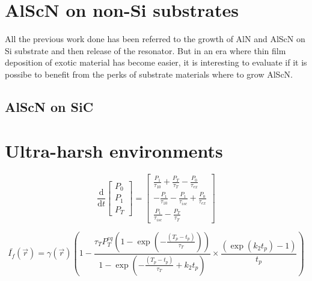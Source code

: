 \section{AlScN on non-Si substrates}
All the previous work done has been referred to the growth of AlN and AlScN on Si substrate and then release of the resonator. But in an era where thin film deposition of exotic material has become easier, it is interesting to evaluate if it is possibe to benefit from the perks of substrate materials where to grow AlScN.

\subsection{AlScN on SiC}


\section{Ultra-harsh environments}


\begin{equation}\label{eqn:rate_eqns}
\frac{\textrm{d}}{\textrm{d}t}\left[
\begin{array}{l}
P_{\textit{0}} \\
P_{\textit{1}} \\
P_{\textit{T}}
\end{array}
\right] =
\left[
\begin{array}{l}
\frac{P_{\textit{1}}}{\tau_{\textit{10}}} + \frac{P_{\textit{T}}}{\tau_{\textit{T}}} - \frac{P_{\textit{0}}}{\tau_{\textit{ex}}} \\
- \frac{P_{\textit{1}}}{\tau_{\textit{10}}} - \frac{P_{\textit{1}}}{\tau_{isc}} + \frac{P_{\textit{0}}}{\tau_{\textit{ex}}} \\
\frac{P_{\textit{1}}}{\tau_{isc}} -  \frac{P_{\textit{T}}}{\tau_{\textit{T}}}
\end{array}
\right]
\end{equation}


\begin{equation}\label{eqn:avgfluorescence}
\bar{I_{f}}(\vec{r})
	= \gamma(\vec{r}) \left(1 - \frac{\tau_{\textit{T}} P_{\textit{T}}^{{eq}}\left(1-\exp \left(-\frac{(T_p - t_p)}{\tau_{\textit{T}}}\right)\right)}{1-\exp\left(-\frac{(T_p - t_p)}{\tau_{\textit{T}}} + k_{\textit{2}} t_p\right)} \times \frac{\left(\exp\left(k_{\textit{2}} t_p\right)-1\right)}{t_p} \right)
\end{equation}
